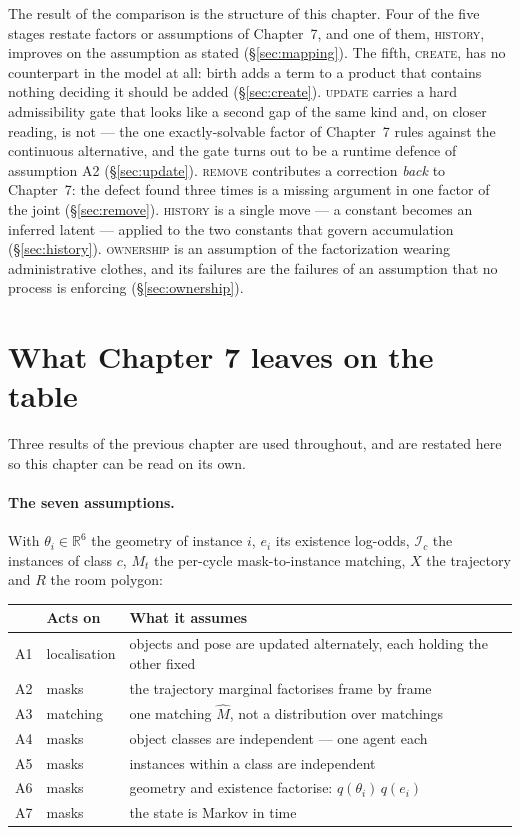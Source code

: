 \documentclass[11pt,a4paper]{report}
\newcommand{\R}{\mathbb{R}}
\newcommand{\stage}[1]{\textsc{#1}}
\newcommand{\Create}{\stage{create}}
\newcommand{\Update}{\stage{update}}
\newcommand{\Remove}{\stage{remove}}
\newcommand{\History}{\stage{history}}
\newcommand{\Ownership}{\stage{ownership}}
\begin{document}
The result of the comparison is the structure of this chapter. Four of the five stages restate
factors or assumptions of Chapter~7, and one of them, \History, improves on the assumption as
stated (\S\ref{sec:mapping}). The fifth, \Create, has no counterpart in the model at all: birth adds
a term to a product that contains nothing deciding it should be added (\S\ref{sec:create}). \Update{}
carries a hard admissibility gate that looks like a second gap of the same kind and, on closer
reading, is not --- the one exactly-solvable factor of Chapter~7 rules against the continuous
alternative, and the gate turns out to be a runtime defence of assumption A2
(\S\ref{sec:update}). \Remove{} contributes a correction \emph{back} to Chapter~7: the defect found
three times is a missing argument in one factor of the joint (\S\ref{sec:remove}). \History{} is a
single move --- a constant becomes an inferred latent --- applied to the two constants that govern
accumulation (\S\ref{sec:history}). \Ownership{} is an assumption of the factorization wearing
administrative clothes, and its failures are the failures of an assumption that no process is
enforcing (\S\ref{sec:ownership}).

\section{What Chapter 7 leaves on the table}
\label{sec:recap}

Three results of the previous chapter are used throughout, and are restated here so this chapter can
be read on its own.

\paragraph{The seven assumptions.} With $\theta_i\in\R^6$ the geometry of instance $i$, $e_i$ its
existence log-odds, $\mathcal{I}_c$ the instances of class $c$, $M_t$ the per-cycle mask-to-instance
matching, $X$ the trajectory and $R$ the room polygon:

\begin{center}
\begin{tabular}{@{}l l p{8.6cm}@{}}
\toprule
& Acts on & What it assumes \\
\midrule
A1 & localisation & objects and pose are updated alternately, each holding the other fixed \\
A2 & masks & the trajectory marginal factorises frame by frame \\
A3 & matching & one matching $\hat M$, not a distribution over matchings \\
A4 & masks & object classes are independent --- one agent each \\
A5 & masks & instances within a class are independent \\
A6 & masks & geometry and existence factorise: $q(\theta_i)\,q(e_i)$ \\
A7 & masks & the state is Markov in time \\
\bottomrule
\end{tabular}
\end{center}
\end{document}
